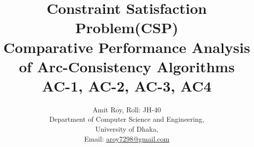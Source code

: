 \documentclass[12pt , conference]{IEEEtran}
\begin{document}
	
	\title{\large \textbf{Constraint Satisfaction Problem(CSP) \\ \large Comparative Performance Analysis of Arc-Consistency Algorithms\\AC-1, AC-2, AC-3, AC4} 			\vspace{-3ex}}
	\author
	{	Amit Roy, Roll: JH-40
		\\Department of Computer Science and Engineering,\\University of Dhaka,\\Email: \href{mailto:aroy7298@gmail.com}{aroy7298@gmail.com}
			\vspace{-3ex}
	}
	\maketitle
\fontsize{12pt}{12pt}\selectfont\noindent
	
\end{document}
